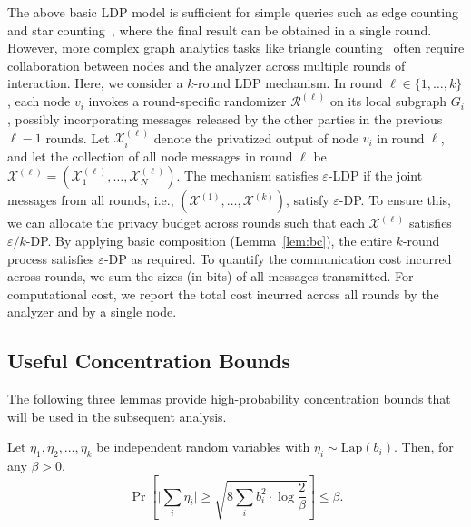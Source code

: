 The above basic LDP model is sufficient for simple queries such as edge counting and star counting~\cite{Imola2021}, where the final result can be obtained in a single round. 
However, more complex graph analytics tasks like triangle counting~\cite{Imola2021, Imola2022,he2025robust} often require collaboration between nodes and the analyzer across multiple rounds of interaction.
Here, we consider a $k$-round LDP mechanism.
In round $\ell \in \{1, \dots, k\}$, each node $v_i$ invokes a round-specific randomizer $\mathcal{R}^{(\ell)}$ on its local subgraph $G_i$, possibly incorporating messages released by the other parties in the previous $\ell-1$ rounds.
Let $\mathcal{X}^{(\ell)}_i$ denote the privatized output of node $v_i$ in round $\ell$, and let the collection of all node messages in round $\ell$ be
$\mathcal{X}^{(\ell)} = 
    (\mathcal{X}^{(\ell)}_1, \ldots, \mathcal{X}^{(\ell)}_N)$.
The mechanism satisfies $\varepsilon$-LDP if the joint messages from all rounds, i.e., $(\mathcal{X}^{(1)}, \dots, \mathcal{X}^{(k)})$, satisfy $\varepsilon$-DP.
To ensure this, we can allocate the privacy budget across rounds such that each $\mathcal{X}^{(\ell)}$ satisfies $\varepsilon / k$-DP. 
By applying basic composition (Lemma~\ref{lem:bc}), the entire $k$-round process satisfies $\varepsilon$-DP as required.
To quantify the communication cost incurred across rounds, we sum the sizes (in bits) of all messages transmitted. 
For computational cost, we report the total cost incurred across all rounds by the analyzer and by a single node.





\subsection{Useful Concentration Bounds}
The following three lemmas provide high-probability concentration bounds that will be used in the subsequent analysis.
 
\begin{lemma}
\label{lem:con_lap}
Let $\eta_1, \eta_2, \dots, \eta_k$ be independent random variables with $\eta_i \sim \mathrm{Lap}(b_i)$. Then, for any $\beta > 0$,
\begin{equation*}
\label{eq:lap_bound}
\Pr\left[\bigg| \sum_i \eta_i \bigg| \geq \sqrt{8 \sum_i b_i^2 \cdot \log\frac{2}{\beta}}\right] \leq \beta.
\end{equation*}

\end{lemma}

